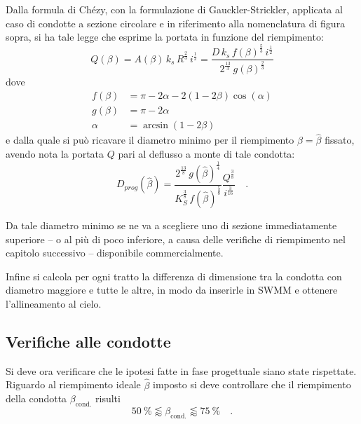 Dalla formula di Chézy, con la formulazione di Gauckler-Strickler, applicata al caso di condotte a sezione circolare e in riferimento alla nomenclatura di figura sopra, si ha tale legge che esprime la portata in funzione del riempimento:
\begin{equation}
    Q(\beta) 
    = A(\beta) \, k_s \, R^{\tfrac{2}{3}} \, i^{\tfrac{1}{2}} 
    = \frac{ D \, k_s \, f(\beta)^{\tfrac{5}{3}} \, i^{\tfrac{1}{2}} }{ 2^{\tfrac{13}{3}} \, g(\beta)^{\tfrac{2}{3}} }
\end{equation}
dove 
\begin{align}
    f(\beta) &= \pi - 2 \alpha - 2 (1 - 2 \beta) \cos(\alpha) \\
    g(\beta) &= \pi - 2 \alpha \\
    \alpha &= \arcsin(1 - 2 \beta)
\end{align}
e dalla quale si può ricavare il diametro minimo per il riempimento $\beta = \hat{\beta}$ fissato, avendo nota la portata $Q$ pari al deflusso a monte di tale condotta:
\begin{equation}
    D_{prog}(\hat{\beta}) = \frac{ 2^{\tfrac{13}{8}} \, g(\hat{\beta})^{\tfrac{1}{4}} }{     K_S^{\tfrac{3}{8}} \, f(\hat{\beta})^{\tfrac{5}{8}} } \frac{Q^{\tfrac{3}{8}}}{i^{\tfrac{3}{16}}} \quad .
\end{equation} 

Da tale diametro minimo se ne va a scegliere uno di sezione immediatamente superiore -- o al più di poco inferiore, a causa delle verifiche di riempimento nel capitolo successivo -- disponibile commercialmente.

Infine si calcola per ogni tratto la differenza di dimensione tra la condotta con diametro maggiore e tutte le altre, in modo da inserirle in SWMM e ottenere l'allineamento al cielo.

\subsection{Verifiche alle condotte}
Si deve ora verificare che le ipotesi fatte in fase progettuale siano state rispettate. 
Riguardo al riempimento ideale $\hat \beta$ imposto si deve controllare che il riempimento della condotta $\beta_\text{cond.}$ risulti 
\begin{equation}
    \SI{50}{\percent} \lessapprox \beta_\text{cond.} \lessapprox\SI{75}{\percent} \quad .
\end{equation}

